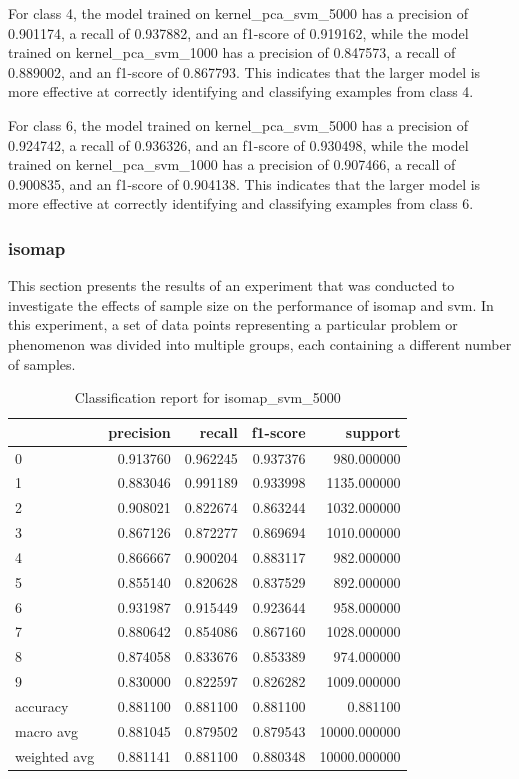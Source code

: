For class 4, the model trained on kernel\_pca\_svm\_5000 has a precision of 0.901174, a recall of 0.937882, and an f1-score of 0.919162, while the model trained on kernel\_pca\_svm\_1000 has a precision of 0.847573, a recall of 0.889002, and an f1-score of 0.867793. This indicates that the larger model is more effective at correctly identifying and classifying examples from class 4.

For class 6, the model trained on kernel\_pca\_svm\_5000 has a precision of 0.924742, a recall of 0.936326, and an f1-score of 0.930498, while the model trained on kernel\_pca\_svm\_1000 has a precision of 0.907466, a recall of 0.900835, and an f1-score of 0.904138. This indicates that the larger model is more effective at correctly identifying and classifying examples from class 6.

\subsubsection{\gls{isomap}}\label{subsubsec:experiment_4_isomap}
This section presents the results of an experiment that was conducted to investigate the effects of sample size on the performance of \gls{isomap} and \gls{svm}. In this experiment, a set of data points representing a particular problem or phenomenon was divided into multiple groups, each containing a different number of samples.
\begin{table}[htb!]
    \centering
    \begin{tabular}{lrrrr}
        \toprule
        & precision & recall & f1-score & support \\
    \midrule
    0 & 0.913760 & 0.962245 & 0.937376 & 980.000000 \\
    1 & 0.883046 & 0.991189 & 0.933998 & 1135.000000 \\
    2 & 0.908021 & 0.822674 & 0.863244 & 1032.000000 \\
    3 & 0.867126 & 0.872277 & 0.869694 & 1010.000000 \\
    4 & 0.866667 & 0.900204 & 0.883117 & 982.000000 \\
    5 & 0.855140 & 0.820628 & 0.837529 & 892.000000 \\
    6 & 0.931987 & 0.915449 & 0.923644 & 958.000000 \\
    7 & 0.880642 & 0.854086 & 0.867160 & 1028.000000 \\
    8 & 0.874058 & 0.833676 & 0.853389 & 974.000000 \\
    9 & 0.830000 & 0.822597 & 0.826282 & 1009.000000 \\
    accuracy & 0.881100 & 0.881100 & 0.881100 & 0.881100 \\
    macro avg & 0.881045 & 0.879502 & 0.879543 & 10000.000000 \\
    weighted avg & 0.881141 & 0.881100 & 0.880348 & 10000.000000 \\
    \bottomrule
    \end{tabular}
    \caption{Classification report for isomap\_svm\_5000}
    \label{tab:classification-report-isomap_svm_5000}
\end{table}


